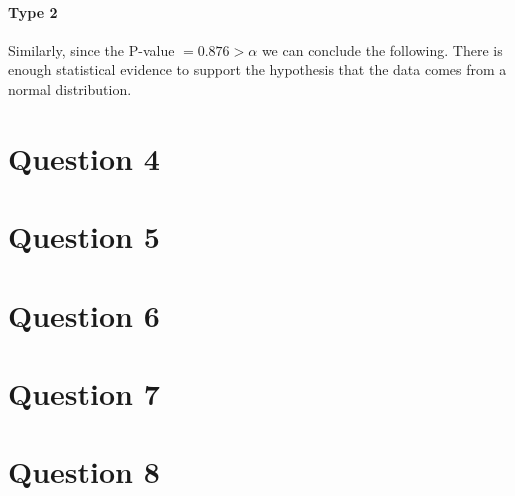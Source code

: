 \documentclass{article}
\begin{document}
  \paragraph{Type 2} Similarly, since the P-value $= 0.876 > \alpha$ we can conclude the following. There is enough statistical evidence to support the hypothesis that the data comes from a normal distribution.
\section*{Question 4}

\section*{Question 5}

\section*{Question 6}

\section*{Question 7}

\section*{Question 8}
\end{document}
